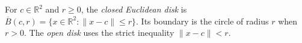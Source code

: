 
For $c\in\mathbb R^2$ and $r\ge0$, the \emph{closed Euclidean disk} is $\overline B(c,r)=\{x\in\mathbb R^2:\|x-c\|\le r\}$. Its boundary is the circle of radius $r$ when $r>0$. The \emph{open disk} uses the strict inequality $\|x-c\|<r$.
